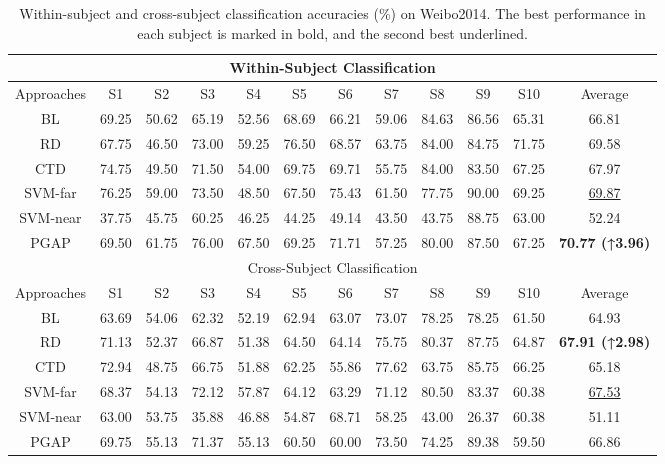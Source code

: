 \documentclass[journal,twocolumn]{IEEEtran}
\begin{document}
\begin{table}[htpb]
  \centering
  \caption{Within-subject and cross-subject classification accuracies (\%) on Weibo2014. The best performance in each subject is marked in bold, and the second best underlined.}
  \label{tab:weibo2014-result}
  \begin{tabular}{c|c|c|c|c|c|c|c|c|c|c|c}
  \toprule
  \multicolumn{12}{c}{Within-Subject Classification} \\
  \midrule
  Approaches & S1 & S2 & S3 & S4 & S5 & S6 & S7 & S8 & S9 & S10 & Average \\
  \midrule
  BL & 69.25 & 50.62 & 65.19 & 52.56 & 68.69 & 66.21 & 59.06 & 84.63 & 86.56 & 65.31 & 66.81 \\
  RD & 67.75 & 46.50 & 73.00 & 59.25 & 76.50 & 68.57 & 63.75 & 84.00 & 84.75 & 71.75 & 69.58 \\
  CTD & 74.75 & 49.50 & 71.50 & 54.00 & 69.75 & 69.71 & 55.75 & 84.00 & 83.50 & 67.25 & 67.97 \\
  SVM-far & 76.25 & 59.00 & 73.50 & 48.50 & 67.50 & 75.43 & 61.50 & 77.75 & 90.00 & 69.25 & \underline{69.87} \\
  SVM-near & 37.75 & 45.75 & 60.25 & 46.25 & 44.25 & 49.14 & 43.50 & 43.75 & 88.75 & 63.00 & 52.24 \\
  PGAP & 69.50 & 61.75 & 76.00 & 67.50 & 69.25 & 71.71 & 57.25 & 80.00 & 87.50 & 67.25 & \textbf{70.77 (↑3.96)} \\
  \midrule
  \multicolumn{12}{c}{Cross-Subject Classification} \\
  \midrule
  Approaches & S1 & S2 & S3 & S4 & S5 & S6 & S7 & S8 & S9 & S10 & Average \\
  \midrule
  BL & 63.69 & 54.06 & 62.32 & 52.19 & 62.94 & 63.07 & 73.07 & 78.25 & 78.25 & 61.50 & 64.93 \\
  RD & 71.13 & 52.37 & 66.87 & 51.38 & 64.50 & 64.14 & 75.75 & 80.37 & 87.75 & 64.87 & \textbf{67.91 (↑2.98)} \\
  CTD & 72.94 & 48.75 & 66.75 & 51.88 & 62.25 & 55.86 & 77.62 & 63.75 & 85.75 & 66.25 & 65.18 \\
  SVM-far & 68.37 & 54.13 & 72.12 & 57.87 & 64.12 & 63.29 & 71.12 & 80.50 & 83.37 & 60.38 & \underline{67.53} \\
  SVM-near & 63.00 & 53.75 & 35.88 & 46.88 & 54.87 & 68.71 & 58.25 & 43.00 & 26.37 & 60.38 & 51.11 \\
  PGAP & 69.75 & 55.13 & 71.37 & 55.13 & 60.50 & 60.00 & 73.50 & 74.25 & 89.38 & 59.50 & 66.86 \\
  \bottomrule
  \end{tabular}
\end{table}
  
\end{document}
